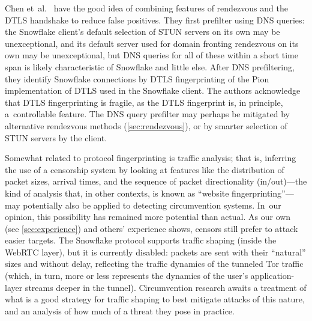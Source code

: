 \documentclass[letterpaper,twocolumn]{article}
\begin{document}
Chen et~al.~\cite{Chen2023a}
have the good idea of combining features
of rendezvous and the DTLS handshake
to reduce false positives.
They first prefilter using DNS queries:
the Snowflake client's default selection of STUN servers
on its own may be unexceptional,
and its default server used for domain fronting rendezvous
on its own may be unexceptional,
but DNS queries for all of these within a short time span
is likely characteristic of Snowflake and little else.
After DNS prefiltering, they identify Snowflake connections
by DTLS fingerprinting of the Pion implementation of DTLS
used in the Snowflake client.
The authors acknowledge that DTLS fingerprinting
is fragile, as the DTLS fingerprint is, in principle,
a~controllable feature.
The DNS query prefilter may perhaps be mitigated
by alternative rendezvous methods (\autoref{sec:rendezvous}),
or by smarter selection of STUN servers by the client.

Somewhat related to protocol fingerprinting is traffic analysis;
that is, inferring the use of a censorship system
by looking at features like the distribution of packet sizes,
arrival times, and the sequence of packet directionality (in/out)---the
kind of analysis that, in other contexts, is known as ``website fingerprinting''---may
potentially also be applied to detecting circumvention systems.
In~our opinion, this possibility has remained more potential than actual.
As our own (see \autoref{sec:experience}) and others' experience shows,
censors still prefer to attack easier targets.
The Snowflake protocol supports traffic shaping (inside the WebRTC layer),
but it is currently disabled:
packets are sent with their ``natural'' sizes and without delay,
reflecting the traffic dynamics of the tunneled Tor traffic
(which, in turn, more or less represents the dynamics
of the user's application-layer streams deeper in the tunnel).
Circumvention research awaits a treatment of
what is a good strategy for traffic shaping to
best mitigate attacks of this nature,
and an analysis of how much of a threat they pose in practice.
\end{document}
